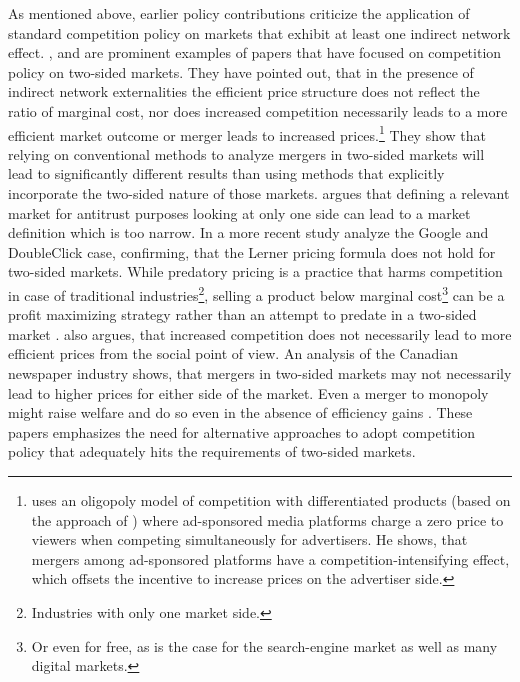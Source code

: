 \documentclass[12pt,a4paper,notitlepage]{article}
\begin{document}
As mentioned above, earlier policy contributions criticize the application of standard competition policy on markets that exhibit at least one indirect network effect. \citet{evans_antitrust_2003}, \citet{evans_industrial_2007} \citet{wright_one-sided_2004} and \citet{kaiser_price_2006} are prominent examples of papers that have focused on competition policy on two-sided markets. They have pointed out, that in the presence of indirect network externalities the efficient price structure does not reflect the ratio of marginal cost, nor does increased competition necessarily leads to a more efficient market outcome or merger leads to increased prices.\footnote{\citet{malam_mergers_2011} uses an oligopoly model of competition with differentiated products (based on the approach of \citet{salop_monopolistic_1979}) where ad-sponsored media platforms charge a zero price to viewers when competing simultaneously for advertisers. He shows, that mergers among ad-sponsored platforms have a competition-intensifying effect, which offsets the incentive to increase prices on the advertiser side.} They show that relying on conventional methods to analyze mergers in two-sided markets will lead to significantly different results than using methods that explicitly incorporate the two-sided nature of those markets. \citet{evans_antitrust_2003} argues that defining a relevant market for antitrust purposes looking at only one side can lead to a market definition which is too narrow. In a more recent study \citet{evans_analysis_2008} analyze the Google and DoubleClick case, confirming, that the Lerner pricing formula does not hold for two-sided markets. While predatory pricing is a practice that harms competition in case of traditional industries\footnote{Industries with only one market side.}, selling a product below marginal cost\footnote{Or even for free, as is the case for the search-engine market as well as many digital markets.} can be a profit maximizing strategy rather than an attempt to predate in a two-sided market \citep{wright_one-sided_2004}. \citet{wright_one-sided_2004} also argues, that increased competition does not necessarily lead to more efficient prices from the social point of view. An analysis of the Canadian newspaper industry shows, that mergers in two-sided markets may not necessarily lead to higher prices for either side of the market. Even a merger to monopoly might raise welfare and do so even in the absence of efficiency gains \citep{leonello_horizontal_2010}. These papers emphasizes the need for alternative approaches to adopt competition policy that adequately hits the requirements of two-sided markets. 
\end{document}
